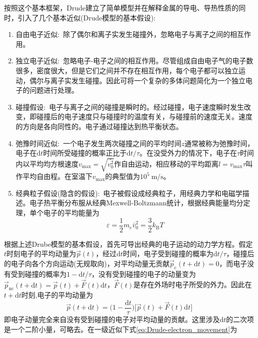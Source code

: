 按照这个基本框架，Drude建立了简单模型并在解释金属的导电、导热性质的同时，引入了几个基本近似(Drude模型的基本假设):
\begin{enumerate}
	\item 自由电子近似:~除了偶尔和离子实发生碰撞外，忽略电子与离子之间的相互作用。 
	\item 独立电子近似:~忽略电子-电子之间的相互作用。尽管组成自由电子气的电子数很多，密度很大，但是它们之间并不存在相互作用，每个电子都可以独立运动，偶尔与离子实发生碰撞。因此可将一个复杂的多体问题简化为一个独立电子的问题进行处理。

	\item 碰撞假设:~电子与离子之间的碰撞是瞬时的。经过碰撞，电子速度瞬时发生改变，即碰撞后的电子速度只与碰撞时的温度有关，与碰撞前的速度无关。速度的方向是各向同性的。电子通过碰撞达到热平衡状态。

	\item 弛豫时间近似:~一个电子发生两次碰撞之间的平均时间$z$通常被称为弛豫时间，电子在$\mathrm{d}t$时间所受碰撞的概率正比于$\mathrm{d}t/\tau$。在没受外力的情况下，电子在$\tau$时间内以平均均方根速度$v_{\max}=\sqrt{\bar{v_0^2}}$作自由运动，相应移动的平均距离$l=v_{\max}\tau$叫作平均自由程。在室温下$v_{\max}$的典型值为$10^5~\mathrm{m/s}$。

	\item 经典粒子假设(隐含的假设):~电子被假设成经典粒子，用经典力学和电磁学描述。电子热平衡分布服从经典Mexwell-Boltzmann统计，根据经典能量均分定理，单个电子的平均能量为
		\begin{displaymath}
			\varepsilon=\dfrac12m_e\bar{v}_0^2=\dfrac32k_{\mathrm{B}}T
		\end{displaymath}
\end{enumerate}
根据上述Drube模型的基本假设，首先可导出经典的电子运动的动力学方程。假定$t$时刻电子的平均动量为$\vec p(t)$，经过$\mathrm{d}t$时间，电子受到碰撞的概率为$\mathrm{d}t/\tau$，碰撞后的电子向各个方向运动(无规取向)，对平均动量无贡献$\vec p_{\mathrm{c}}(t+\mathrm{d}t)=0$，而电子没有受到碰撞的概率为$1-\mathrm{d}t/\tau$，没有受到碰撞的电子的动量变为$\vec p_{\mathrm{nc}}(t+\mathrm{d}t)=\vec p(t)+\vec F(t)\mathrm{d}t$，$\vec F(t)$是存在外场时电子所受的外力。因此在$t+\mathrm{d}t$时刻,电子的平均动量为
\begin{equation}
	\vec p(t+\mathrm{d}t)=\bigg(1-\dfrac{\mathrm{d}t}{\tau}\bigg)\bigg[\vec p(t)+\vec F(t)\mathrm{d}t\bigg]
	\label{eq:Drude-electron_movement}
\end{equation} 
即电子动量完全来自没有受到碰撞的电子对平均动量的贡献。这里涉及$\mathrm{d}t$的二次项是一个二阶小量，可略去。在一级近似下式\eqref{eq:Drude-electron_movement}为
